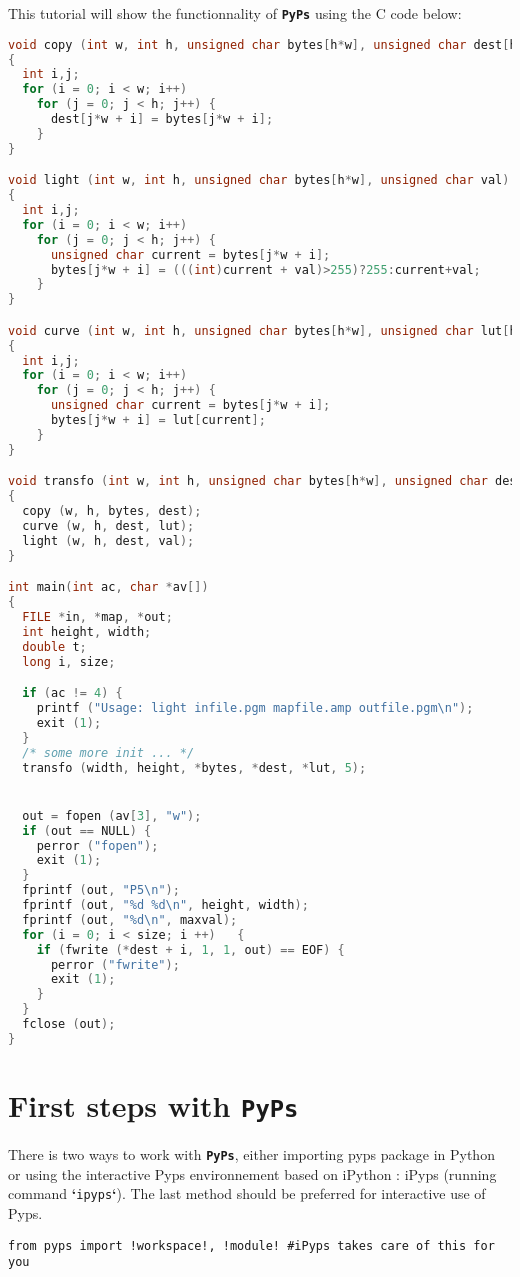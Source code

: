 \documentclass[a4paper]{article}
\newcommand{\PYPS}{\textbf{\texttt{PyPs}}}
\newcommand{\cmd}[1]{\textbf{`}\texttt{#1}\textbf{`}}
\begin{document}
This tutorial will show the functionnality of \PYPS{} using the C code below:
\begin{lstlisting}[language=c]
void copy (int w, int h, unsigned char bytes[h*w], unsigned char dest[h*w])
{
  int i,j;
  for (i = 0; i < w; i++)  
	for (j = 0; j < h; j++) {
	  dest[j*w + i] = bytes[j*w + i];
	}
}

void light (int w, int h, unsigned char bytes[h*w], unsigned char val)
{
  int i,j;
  for (i = 0; i < w; i++)  
	for (j = 0; j < h; j++) {
	  unsigned char current = bytes[j*w + i];
	  bytes[j*w + i] = (((int)current + val)>255)?255:current+val;
	}
}

void curve (int w, int h, unsigned char bytes[h*w], unsigned char lut[h*w])
{
  int i,j;
  for (i = 0; i < w; i++)  
	for (j = 0; j < h; j++)	{
	  unsigned char current = bytes[j*w + i];
	  bytes[j*w + i] = lut[current];
	}
}

void transfo (int w, int h, unsigned char bytes[h*w], unsigned char dest[h*w], unsigned char lut[h*w], unsigned char val)
{
  copy (w, h, bytes, dest);
  curve (w, h, dest, lut);
  light (w, h, dest, val);
}

int main(int ac, char *av[])
{
  FILE *in, *map, *out;
  int height, width;
  double t;
  long i, size;

  if (ac != 4) {
	printf ("Usage: light infile.pgm mapfile.amp outfile.pgm\n");
	exit (1);
  }
  /* some more init ... */
  transfo (width, height, *bytes, *dest, *lut, 5);


  out = fopen (av[3], "w");
  if (out == NULL) {
	perror ("fopen");
	exit (1);
  }
  fprintf (out, "P5\n");
  fprintf (out, "%d %d\n", height, width);
  fprintf (out, "%d\n", maxval);
  for (i = 0; i < size; i ++)	{
	if (fwrite (*dest + i, 1, 1, out) == EOF) {
	  perror ("fwrite");
	  exit (1);
	}
  }
  fclose (out);
}
\end{lstlisting}

\section{First steps with \PYPS{}}

There is two ways to work with \PYPS{}, either importing pyps package in Python or using the interactive Pyps environnement based on iPython : iPyps (running command \cmd{ipyps}).
The last method should be preferred for interactive use of Pyps.

\begin{lstlisting}
from pyps import !workspace!, !module! #iPyps takes care of this for you
\end{lstlisting}
\end{document}
